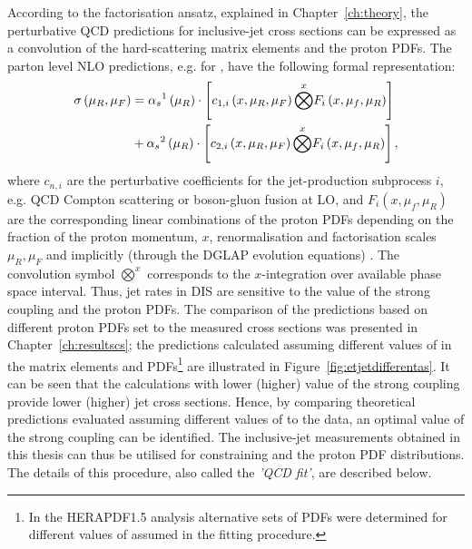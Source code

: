 According to the factorisation ansatz, explained in Chapter~\ref{ch:theory}, the perturbative QCD predictions for inclusive-jet cross sections can be expressed as a convolution of the hard-scattering matrix elements and the proton PDFs. The parton level NLO predictions, e.g. for \dsdetjetb, have the following formal representation:
\begin{equation}
	\begin{split}
\sigma\left( \mu_R, \mu_F\right)  &= \mbox{$\alpha_{s}$}^1\left( \mu_R\right) \cdot \left[ c_{1,i}\left( x, \mu_R, \mu_F\right) \overset{x}{\bigotimes } F_i\left( x, \mu_f, \mu_R \right) \right] \\
&+ \mbox{$\alpha_{s}$}^2\left( \mu_R\right) \cdot \left[ c_{2,i}\left( x, \mu_R, \mu_F\right) \overset{x}{\bigotimes } F_i\left( x, \mu_f, \mu_R \right) \right],
	\end{split}
	\label{eq:fitnloqcdpredictions}
\end{equation}
where $c_{n,i}$ are the perturbative coefficients for the jet-production subprocess $i$, e.g. QCD Compton scattering or boson-gluon fusion at LO, and $F_i\left( x, \mu_f, \mu_R \right)$ are the corresponding linear combinations of the proton PDFs depending on the fraction of the proton momentum, $x$, renormalisation and factorisation scales $\mu_R, \mu_F$ and implicitly (through the DGLAP evolution equations) \as. The convolution symbol $\overset{x}{\bigotimes}$ corresponds to the $x$-integration over available phase space interval. Thus, jet rates in DIS are sensitive to the value of the strong coupling and the proton PDFs. The comparison of the predictions based on different proton PDFs set to the measured cross sections was presented in Chapter~\ref{ch:resultscs}; the predictions calculated assuming different values of \asz in the matrix elements and PDFs\footnote{In the HERAPDF1.5 analysis alternative sets of PDFs were determined for different values of \asz assumed in the fitting procedure.} are illustrated in Figure~\ref{fig:etjetdifferentas}. It can be seen that the calculations with lower (higher) value of the strong coupling provide lower (higher) jet cross sections. Hence, by comparing theoretical predictions evaluated assuming different values of \asz to the data, an optimal value of the strong coupling can be identified. The inclusive-jet measurements obtained in this thesis can thus be utilised for constraining \as and the proton PDF distributions. The details of this procedure, also called the \emph{'QCD fit'}, are described below.



